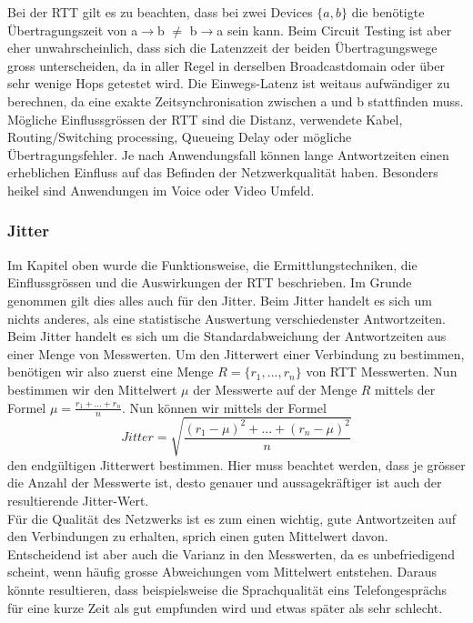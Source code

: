 \documentclass[a4,12pt]{scrartcl}
\begin{document}
\noindent Bei der RTT gilt es zu beachten, dass bei zwei Devices $\{a,b\}$ die benötigte Übertragungszeit von a$\rightarrow$b $\neq$ b$\rightarrow$a sein kann. Beim Circuit Testing ist aber eher unwahrscheinlich, dass sich die Latenzzeit der beiden Übertragungswege gross unterscheiden, da in aller Regel in derselben Broadcastdomain oder über sehr wenige Hops getestet wird. Die Einwegs-Latenz ist weitaus aufwändiger zu berechnen, da eine exakte Zeitsynchronisation zwischen a und b stattfinden muss.\\

\noindent Mögliche Einflussgrössen der RTT sind die Distanz, verwendete Kabel, Routing/Switching processing, Queueing Delay oder mögliche Übertragungsfehler. Je nach Anwendungsfall können lange Antwortzeiten einen erheblichen Einfluss auf das Befinden der Netzwerkqualität haben. Besonders heikel sind Anwendungen im Voice oder Video Umfeld. 
\subsubsection{Jitter}
Im Kapitel oben wurde die Funktionsweise, die Ermittlungstechniken, die Einflussgrössen und die Auswirkungen der RTT beschrieben. Im Grunde genommen gilt dies alles auch für den Jitter. Beim Jitter handelt es sich um nichts anderes, als eine statistische Auswertung verschiedenster Antwortzeiten.\\

\noindent Beim Jitter handelt es sich um die Standardabweichung der Antwortzeiten aus einer Menge von Messwerten. Um den Jitterwert einer Verbindung zu bestimmen, benötigen wir also zuerst eine Menge $R = \{r_1,...,r_n\}$ von RTT Messwerten. Nun bestimmen wir den Mittelwert $\mu$ der Messwerte auf der Menge $R$ mittels der Formel $\mu = \frac{r_1+...+r_n}{n}$. Nun können wir mittels der Formel
\begin{equation}
Jitter = \sqrt{\frac{(r_1-\mu)^2 + ... + (r_n-\mu)^2}{n}}
\end{equation}
den endgültigen Jitterwert bestimmen. Hier muss beachtet werden, dass je grösser die Anzahl der Messwerte ist, desto genauer und aussagekräftiger ist auch der resultierende Jitter-Wert.
\\

\noindent Für die Qualität des Netzwerks ist es zum einen wichtig, gute Antwortzeiten auf den Verbindungen zu erhalten, sprich einen guten Mittelwert davon. Entscheidend ist aber auch die Varianz in den Messwerten, da es unbefriedigend scheint, wenn häufig grosse Abweichungen vom Mittelwert entstehen. Daraus könnte resultieren, dass beispielsweise die Sprachqualität eins Telefongesprächs für eine kurze Zeit als gut empfunden wird und etwas später als sehr schlecht.
\end{document}
